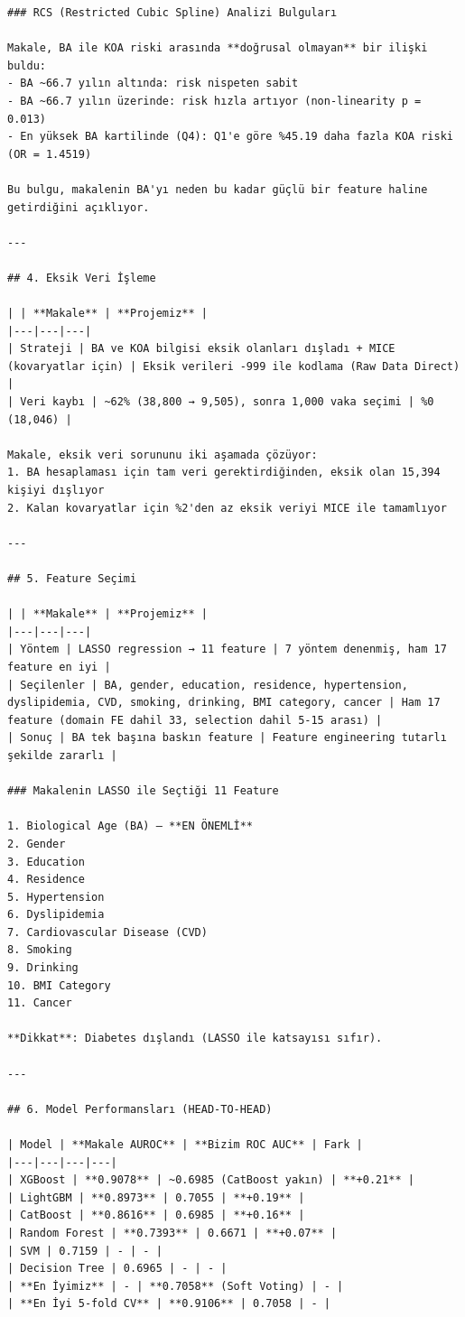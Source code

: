 ﻿\documentclass[11pt,a4paper]{article}
\begin{document}
\begin{verbatim}
### RCS (Restricted Cubic Spline) Analizi Bulguları

Makale, BA ile KOA riski arasında **doğrusal olmayan** bir ilişki buldu:
- BA ~66.7 yılın altında: risk nispeten sabit
- BA ~66.7 yılın üzerinde: risk hızla artıyor (non-linearity p = 0.013)
- En yüksek BA kartilinde (Q4): Q1'e göre %45.19 daha fazla KOA riski (OR = 1.4519)

Bu bulgu, makalenin BA'yı neden bu kadar güçlü bir feature haline getirdiğini açıklıyor.

---

## 4. Eksik Veri İşleme

| | **Makale** | **Projemiz** |
|---|---|---|
| Strateji | BA ve KOA bilgisi eksik olanları dışladı + MICE (kovaryatlar için) | Eksik verileri -999 ile kodlama (Raw Data Direct) |
| Veri kaybı | ~62% (38,800 → 9,505), sonra 1,000 vaka seçimi | %0 (18,046) |

Makale, eksik veri sorununu iki aşamada çözüyor:
1. BA hesaplaması için tam veri gerektirdiğinden, eksik olan 15,394 kişiyi dışlıyor
2. Kalan kovaryatlar için %2'den az eksik veriyi MICE ile tamamlıyor

---

## 5. Feature Seçimi

| | **Makale** | **Projemiz** |
|---|---|---|
| Yöntem | LASSO regression → 11 feature | 7 yöntem denenmiş, ham 17 feature en iyi |
| Seçilenler | BA, gender, education, residence, hypertension, dyslipidemia, CVD, smoking, drinking, BMI category, cancer | Ham 17 feature (domain FE dahil 33, selection dahil 5-15 arası) |
| Sonuç | BA tek başına baskın feature | Feature engineering tutarlı şekilde zararlı |

### Makalenin LASSO ile Seçtiği 11 Feature

1. Biological Age (BA) — **EN ÖNEMLİ**
2. Gender
3. Education
4. Residence
5. Hypertension
6. Dyslipidemia
7. Cardiovascular Disease (CVD)
8. Smoking
9. Drinking
10. BMI Category
11. Cancer

**Dikkat**: Diabetes dışlandı (LASSO ile katsayısı sıfır).

---

## 6. Model Performansları (HEAD-TO-HEAD)

| Model | **Makale AUROC** | **Bizim ROC AUC** | Fark |
|---|---|---|---|
| XGBoost | **0.9078** | ~0.6985 (CatBoost yakın) | **+0.21** |
| LightGBM | **0.8973** | 0.7055 | **+0.19** |
| CatBoost | **0.8616** | 0.6985 | **+0.16** |
| Random Forest | **0.7393** | 0.6671 | **+0.07** |
| SVM | 0.7159 | - | - |
| Decision Tree | 0.6965 | - | - |
| **En İyimiz** | - | **0.7058** (Soft Voting) | - |
| **En İyi 5-fold CV** | **0.9106** | 0.7058 | - |


\end{verbatim}
\end{document}
